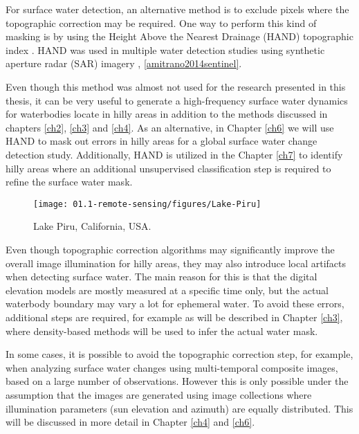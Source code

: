 For surface water detection, an alternative method is to exclude pixels where the topographic correction may be required. One way to perform this kind of masking is by using the Height Above the Nearest Drainage (HAND) topographic index \cite{Renno2008, Nobre2011}. HAND was used in multiple water detection studies using synthetic aperture radar (SAR) imagery \citep{Eilander2014}, \ref{amitrano2014sentinel}.


Even though this method was almost not used for the research presented in this thesis, it can be very useful to generate a high-frequency surface water dynamics for waterbodies locate in hilly areas in addition to the methods discussed in chapters \ref{ch2}, \ref{ch3} and \ref{ch4}. As an alternative, in Chapter \ref{ch6} we will use HAND to mask out errors in hilly areas for a global surface water change detection study. Additionally, HAND is utilized in the Chapter \ref{ch7} to identify hilly areas where an additional unsupervised classification step is required to refine the surface water mask.

\begin{wrapfigure}{r}{0.5\textwidth}
	\begin{center}
		\texttt{[image: 01.1-remote-sensing/figures/Lake-Piru]}
	\end{center}
	\caption{Lake Piru, California, USA. \protect \footnotemark}
\end{wrapfigure}


Even though topographic correction algorithms may significantly improve the overall image illumination for hilly areas, they may also introduce local artifacts when detecting surface water. The main reason for this is that the digital elevation models are mostly measured at a specific time only, but the actual waterbody boundary may vary a lot for ephemeral water. To avoid these errors, additional steps are required, for example as will be described in Chapter \ref{ch3}, where density-based methods will be used to infer the actual water mask.

In some cases, it is possible to avoid the topographic correction step, for example, when analyzing surface water changes using multi-temporal composite images, based on a large number of observations. However this is only possible under the assumption that the images are generated using image collections where illumination parameters (sun elevation and azimuth) are equally distributed. This will be discussed in more detail in Chapter \ref{ch4} and \ref{ch6}.

